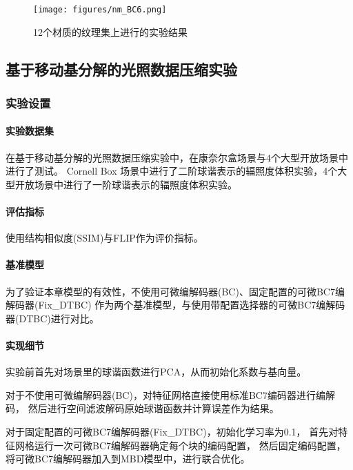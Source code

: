 \begin{figure}[htbp]
    \centering
    \texttt{[image: figures/nm\_BC6.png]}
    \caption{12个材质的纹理集上进行的实验结果}
    \label{fig:nm_BC6}
\end{figure}


\subsection{基于移动基分解的光照数据压缩实验}

\subsubsection{实验设置}

\paragraph{实验数据集}

在基于移动基分解的光照数据压缩实验中，在康奈尔盒场景与4个大型开放场景中进行了测试。
Cornell Box 场景中进行了二阶球谐表示的辐照度体积实验，4个大型开放场景中进行了一阶球谐表示的辐照度体积实验。

\paragraph{评估指标}

使用结构相似度(SSIM)与FLIP作为评价指标。

\paragraph{基准模型}

为了验证本章模型的有效性，不使用可微编解码器(BC)、固定配置的可微BC7编解码器(Fix\_DTBC)
作为两个基准模型，与使用带配置选择器的可微BC7编解码器(DTBC)进行对比。

\paragraph{实现细节}

实验前首先对场景里的球谐函数进行PCA，从而初始化系数与基向量。

对于不使用可微编解码器(BC)，对特征网格直接使用标准BC7编码器进行编解码，
然后进行空间滤波解码原始球谐函数并计算误差作为结果。

对于固定配置的可微BC7编解码器(Fix\_DTBC)，初始化学习率为0.1，
首先对特征网格运行一次可微BC7编解码器确定每个块的编码配置，
然后固定编码配置，将可微BC7编解码器加入到MBD模型中，进行联合优化。

